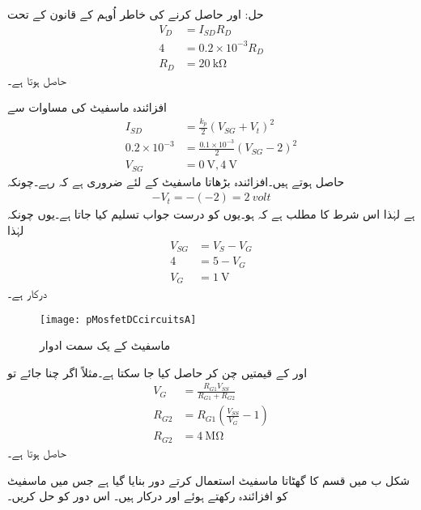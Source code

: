 حل: اور  حاصل کرنے کی خاطر اُوہم کے قانون کے تحت
\begin{align*}
V_D&=I_{SD}R_D\\
4&=0.2 \times 10^{-3}R_D\\
R_D&=\SI{20}{\kilo \ohm}
\end{align*}
حاصل ہوتا ہے۔

افزائندہ ماسفیٹ کی مساوات سے
\begin{align*}
I_{SD}&=\frac{k_p}{2} \left(V_{SG}+V_t \right )^{2}\\
0.2 \times 10^{-3}&=\frac{0.1 \times 10^{-3}}{2} \left(V_{SG}-2 \right )^2 \\
V_{SG}&=\SI{0}{\volt}, \SI{4}{\volt}
\end{align*}
حاصل ہوتے ہیں۔افزائندہ  بڑھاتا ماسفیٹ کے لئے ضروری ہے کہ  رہے۔چونکہ
\begin{align*}
-V_t=-\left(-2 \right)=\SI{2}{volt}
\end{align*}
ہے لہٰذا اس شرط کا مطلب ہے کہ  ہو۔یوں   کو درست جواب تسلیم کیا جاتا ہے۔یوں چونکہ  لہٰذا
\begin{align*}
V_{SG}&=V_S-V_G\\
4&=5-V_G\\
V_G&=\SI{1}{\volt}
\end{align*}
درکار ہے۔
\begin{figure}
\centering
\texttt{[image: pMosfetDCcircuitsA]}
\caption{ ماسفیٹ کے یک سمت ادوار}
\label{شکل_جمع_ماسفیٹ_کے_یک_سمتی_ادوار_الف}
\end{figure}
 اور  کے قیمتیں چن کر   حاصل کیا جا سکتا ہے۔مثلاً اگر  چنا جائے تو
\begin{align*}
V_G&=\frac{R_{G1} V_{SS}}{R_{G1}+R_{G2}}\\
R_{G2}&=R_{G1} \left(\frac{V_{SS}}{V_G}-1 \right )\\
R_{G2}&=\SI{4}{\mega \ohm}
\end{align*}
حاصل ہوتا ہے۔

شکل  ب میں  قسم کا گھٹاتا ماسفیٹ استعمال کرتے دور بنایا گیا ہے جس میں ماسفیٹ کو افزائندہ رکھتے ہوئے   اور
   درکار ہیں۔ اس دور کو حل کریں۔

